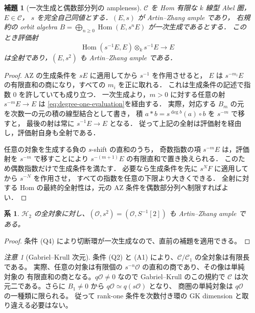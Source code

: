 \documentclass[a4paper,11pt]{ltjsarticle}
\numberwithin{equation}{section}
\theoremstyle{plain}
\newtheorem{lemma}[theorem]{補題}
\newtheorem{corollary}[theorem]{系}
\theoremstyle{definition}
\theoremstyle{remark}
\newtheorem{remark}[theorem]{注意}
\newcommand{\OO}{\mathcal O}
\newcommand{\cC}{\mathcal C}
\newcommand{\HH}{\mathcal H_2}
\begin{document}
\begin{lemma}[一次生成と偶数部分列の ampleness]
\label{lem:ample-square-from-generation}
$\mathcal C$ を Hom 有限な $k$ 線型 Abel 圏，$E\in\mathcal C$，
$s$ を完全自己同値とする．$(E,s)$ が Artin--Zhang ample であり，
右規約の orbit algebra
$B=\bigoplus_{n\ge0}\operatorname{Hom}(E,s^nE)$ が一次生成であるとする．
このとき評価射
\[
 \operatorname{Hom}(s^{-1}E,E)\otimes_k s^{-1}E\longrightarrow E
 \tag{E}\label{eq:degree-one-evaluation}
\]
は全射であり，$(E,s^2)$ も Artin--Zhang ample である．
\end{lemma}
\begin{proof}
AZ の生成条件を $sE$ に適用してから $s^{-1}$ を作用させると，
$E$ は $s^{-m_i}E$ の有限直和の商になり，すべての $m_i$ を正に取れる．
これは生成条件の記述で指数 $0$ を許していても成り立つ．
一次生成より，$m>0$ に対する任意の射 $s^{-m}E\to E$ は
\eqref{eq:degree-one-evaluation}を経由する．
実際，対応する $B_m$ の元を次数一の元の積の線型結合として書き，
積 $a*b=s^{\deg b}(a)\circ b$ を $s^{-m}$ で移すと，
最後の射は常に $s^{-1}E\to E$ となる．
従って上記の全射は評価射を経由し，評価射自身も全射である．

任意の対象を生成する負の $s$-shift の直和のうち，
奇数指数の項 $s^{-m}E$ は，評価射を $s^{-m}$ で移すことにより
$s^{-(m+1)}E$ の有限直和で置き換えられる．
このため偶数指数だけで生成条件を満たす．
必要なら生成条件を先に $s^N F$ に適用してから $s^{-N}$ を作用させ，
すべての指数を任意の下限より大きくできる．
全射に対する Hom の最終的全射性は，元の AZ 条件を偶数部分列へ制限すればよい．
\end{proof}

\begin{corollary}
$\HH$ の全対象に対し、$(\OO,s^2)=(\OO,S^{-1}[2])$ も
Artin--Zhang ample である。
\end{corollary}
\begin{proof}
条件 (Q4) により切断環が一次生成なので、直前の補題を適用できる。
\end{proof}

\begin{remark}[Gabriel--Krull 次元]
条件 (Q2) と (A1) により、$\cC/\cC_1$ の全対象は有限長である。
実際、任意の対象は有限個の $s^{-n}\OO$ の直和の商であり、その像は単純対象の
有限直和の商となる。$q\OO\ne0$ なので Gabriel--Krull のこの規約で
$\cC$ は次元二である。さらに $B_1\ne0$ から $q\OO\simeq q(s\OO)$ となり、
商圏の単純対象は $q\OO$ の一種類に限られる。
従って rank-one 条件を次数付き環の GK dimension と取り違える必要はない。
\end{remark}
\end{document}
